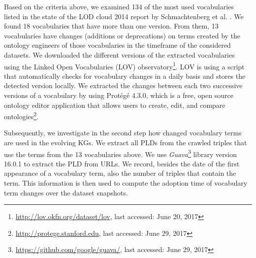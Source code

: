 Based on the criteria above, we examined 134 of the most used vocabularies listed in the state of the LOD cloud 2014 report by Schmachtenberg et al. \cite{schmachtenberg2014adoption}.
We found 18 vocabularies that have more than one version. 
From them, 13 vocabularies have changes (additions or deprecations) on terms created by the ontology engineers of those vocabularies in the timeframe of the considered datasets. 
We downloaded the different versions of the extracted vocabularies using the Linked Open Vocabularies (LOV) observatory\footnote{\url{http://lov.okfn.org/dataset/lov}, last accessed: June 20, 2017}. LOV is using a script that automatically checks for vocabulary changes in a daily basis and stores the detected version locally.
We extracted the changes between each two successive versions of a vocabulary by using Prot\'eg\'e 4.3.0, which is a free, open source ontology editor application that allows users to create, edit, and compare ontologies\footnote{\url{http://protege.stanford.edu}, last accessed: June 29, 2017}. 
%

Subsequently, we investigate in the second step how changed vocabulary terms are used in the evolving KGs. 
We extract all PLDs from the crawled triples that use the terms from the 13 vocabularies above.
We use \textit{Guava}\footnote{\url{https://github.com/google/guava/}, last accessed: June 29, 2017} library version 16.0.1 to extract the PLD from URLs. 
We record, besides the date of the first appearance of a vocabulary term, also the number of triples that contain the term. 
This information is then used to compute the adoption time of vocabulary term changes over the dataset snapshots.

